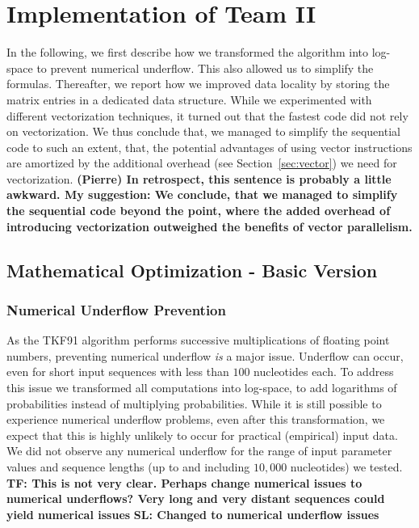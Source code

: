 \documentclass[runningheads,a4paper]{llncs}
\begin{document}
\section{Implementation of Team II}
\label{sec:implementation-2}

In the following, we first describe how we transformed the algorithm into log-space to prevent numerical underflow. 
This also allowed us to simplify the formulas. 
Thereafter, we report how we improved data locality by storing the matrix entries in a dedicated data structure. 
While we experimented with different vectorization techniques, it turned out that the fastest code did not rely on vectorization. 
We thus conclude that, we managed to simplify the sequential code to such an extent, that, the potential advantages of using vector instructions 
are amortized by the additional overhead (see Section~\ref{sec:vector}) we need for vectorization.
\textbf{(Pierre) In retrospect, this sentence is probably a little awkward. My suggestion:
 We conclude, that we managed to simplify the sequential code beyond the point, where the added overhead of introducing vectorization outweighed the benefits of vector parallelism.}

\subsection{Mathematical Optimization - Basic Version}

\subsubsection{Numerical Underflow Prevention}
\label{sec:log}

As the TKF91 algorithm performs successive multiplications of floating point numbers, preventing numerical underflow
{\em is} a major issue. Underflow can occur, even for short input sequences with less than $100$ nucleotides each.
To address this issue we transformed all computations into log-space, to add logarithms of probabilities instead of multiplying probabilities.
While it is still possible to experience numerical underflow problems, even after this transformation, 
we expect that this is highly unlikely to occur for practical (empirical) input data.
We did not observe any numerical underflow for the range of input parameter values and sequence lengths (up to and including $10,000$ nucleotides) 
we tested. \textbf{TF: This is not very clear. Perhaps change numerical issues to numerical underflows? Very long and very distant sequences could yield numerical issues} \textbf{SL: Changed to numerical underflow issues}
\end{document}
